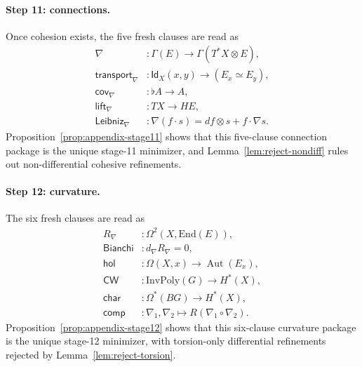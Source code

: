 \documentclass{lmcs}
\theoremstyle{plain}
\theoremstyle{definition}
\theoremstyle{remark}
\newcommand{\Id}{\ensuremath{\mathsf{Id}}}
\newcommand{\Aut}{\ensuremath{\operatorname{Aut}}}
\begin{document}
\paragraph{Step 11: connections.}
Once cohesion exists, the five fresh clauses are read as
\[
\begin{aligned}
\nabla &:\Gamma(E)\to \Gamma(T^\ast X\otimes E),\\
\mathsf{transport}_\nabla &:\Id_X(x,y)\to (E_x \simeq E_y),\\
\mathsf{cov}_\nabla &:\flat A \to A,\\
\mathsf{lift}_\nabla &: TX\to HE,\\
\mathsf{Leibniz}_\nabla &:\nabla(f\cdot s)=df\otimes s + f\cdot \nabla s.
\end{aligned}
\]
Proposition~\ref{prop:appendix-stage11} shows that this five-clause connection package is the unique stage-11 minimizer, and Lemma~\ref{lem:reject-nondiff} rules out non-differential cohesive refinements.

\paragraph{Step 12: curvature.}
The six fresh clauses are read as
\[
\begin{aligned}
R_\nabla &:\Omega^2(X,\mathrm{End}(E)),\\
\mathsf{Bianchi} &: d_\nabla R_\nabla = 0,\\
\mathsf{hol} &: \Omega(X,x)\to \Aut(E_x),\\
\mathsf{CW} &: \mathrm{InvPoly}(G)\to H^\ast(X),\\
\mathsf{char} &: \Omega^\ast(BG)\to H^\ast(X),\\
\mathsf{comp} &: \nabla_1,\nabla_2 \mapsto R(\nabla_1\circ \nabla_2).
\end{aligned}
\]
Proposition~\ref{prop:appendix-stage12} shows that this six-clause curvature package is the unique stage-12 minimizer, with torsion-only differential refinements rejected by Lemma~\ref{lem:reject-torsion}.
\end{document}

